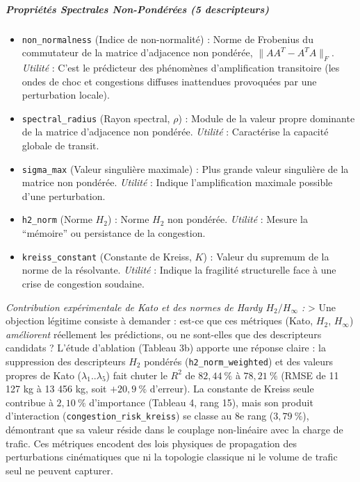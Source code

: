 \documentclass[10pt, a4paper]{article}
\providecommand{\tightlist}{}
\begin{document}
\subparagraph{Propriétés Spectrales Non-Pondérées (5
descripteurs)}\label{propriuxe9tuxe9s-spectrales-non-ponduxe9ruxe9es-5-descripteurs-1}

\begin{itemize}
\tightlist
\item
  \texttt{non\_normalness} (Indice de non-normalité) : Norme de
  Frobenius du commutateur de la matrice d'adjacence non pondérée,
  \(\|AA^T - A^TA\|_F\). \emph{Utilité} : C'est le prédicteur des
  phénomènes d'amplification transitoire (les ondes de choc et
  congestions diffuses inattendues provoquées par une perturbation
  locale).
\item
  \texttt{spectral\_radius} (Rayon spectral, \(\rho\)) : Module de la
  valeur propre dominante de la matrice d'adjacence non pondérée.
  \emph{Utilité} : Caractérise la capacité globale de transit.
\item
  \texttt{sigma\_max} (Valeur singulière maximale) : Plus grande valeur
  singulière de la matrice non pondérée. \emph{Utilité} : Indique
  l'amplification maximale possible d'une perturbation.
\item
  \texttt{h2\_norm} (Norme \(H_2\)) : Norme \(H_2\) non pondérée.
  \emph{Utilité} : Mesure la ``mémoire'' ou persistance de la
  congestion.
\item
  \texttt{kreiss\_constant} (Constante de Kreiss, \(K\)) : Valeur du
  supremum de la norme de la résolvante. \emph{Utilité} : Indique la
  fragilité structurelle face à une crise de congestion soudaine.
\end{itemize}

\emph{Contribution expérimentale de Kato et des normes de Hardy
\(H_2/H_\infty\) :} \textgreater{} Une objection légitime consiste à
demander : est-ce que ces métriques (Kato, \(H_2\), \(H_\infty\))
\emph{améliorent} réellement les prédictions, ou ne sont-elles que des
descripteurs candidats ? L'étude d'ablation (Tableau 3b) apporte une
réponse claire : la suppression des descripteurs \(H_2\) pondérés
(\texttt{h2\_norm\_weighted}) et des valeurs propres de Kato
(\(\lambda_1..\lambda_5\)) fait chuter le \(R^2\) de \(82{,}44\ \%\) à
\(78{,}21\ \%\) (RMSE de 11 127 kg à 13 456 kg, soit \(+20{,}9\ \%\)
d'erreur). La constante de Kreiss seule contribue à \(2{,}10\ \%\)
d'importance (Tableau 4, rang 15), mais son produit d'interaction
(\texttt{congestion\_risk\_kreiss}) se classe au 8e rang
(\(3{,}79\ \%\)), démontrant que sa valeur réside dans le couplage
non-linéaire avec la charge de trafic. Ces métriques encodent des lois
physiques de propagation des perturbations cinématiques que ni la
topologie classique ni le volume de trafic seul ne peuvent capturer.
\end{document}
